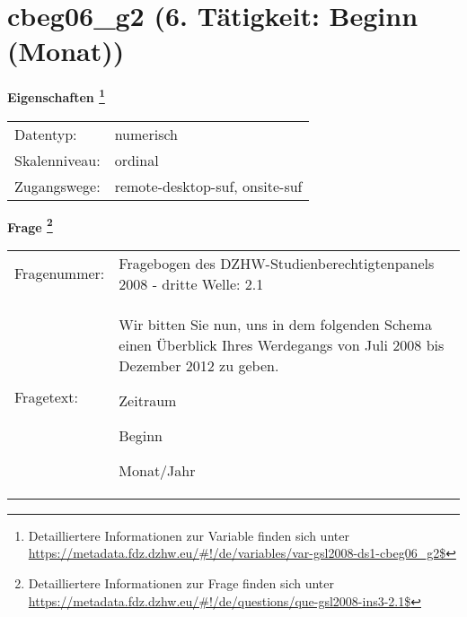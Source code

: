 
    \setcounter{footnote}{0}

    \vspace*{-1.8cm}
	\section{cbeg06\_g2 (6. Tätigkeit: Beginn (Monat))}
	\label{section:cbeg06_g2}



    \vspace*{0.5cm}
    \noindent\textbf{Eigenschaften
	\footnote{Detailliertere Informationen zur Variable finden sich unter
		\url{https://metadata.fdz.dzhw.eu/\#!/de/variables/var-gsl2008-ds1-cbeg06_g2$}}}\\
	\begin{tabularx}{\hsize}{@{}lX}
	Datentyp: & numerisch \\
	Skalenniveau: & ordinal \\
	Zugangswege: &
	  remote-desktop-suf, 
	  onsite-suf
 \\
    \end{tabularx}



				\vspace*{0.5cm}
                \noindent\textbf{Frage
	                \footnote{Detailliertere Informationen zur Frage finden sich unter
		              \url{https://metadata.fdz.dzhw.eu/\#!/de/questions/que-gsl2008-ins3-2.1$}}}\\
				\begin{tabularx}{\hsize}{@{}lX}
					Fragenummer: &
					  Fragebogen des DZHW-Studienberechtigtenpanels 2008 - dritte Welle:
					  2.1
 \\
					Fragetext: & Wir bitten Sie nun, uns in dem folgenden Schema einen Überblick Ihres Werdegangs von Juli 2008 bis Dezember 2012 zu geben.\par  Zeitraum\par  Beginn\par  Monat/Jahr \\
				\end{tabularx}





